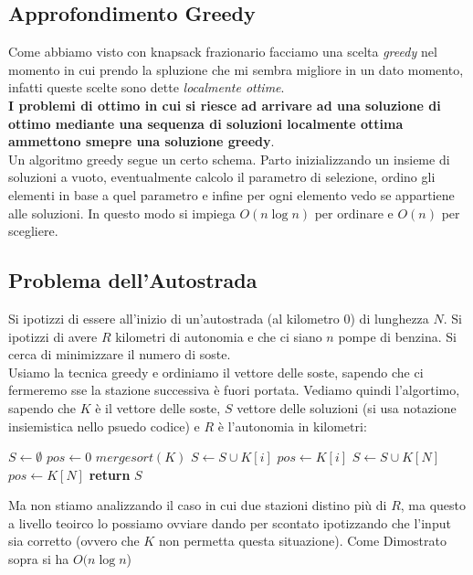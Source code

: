 \documentclass[a4paper,12pt, oneside]{book}
\begin{document}
\subsection{Approfondimento Greedy}
Come abbiamo visto con knapsack frazionario facciamo una scelta
\textit{greedy} nel momento in cui prendo la spluzione che mi sembra
migliore in un dato momento, infatti queste scelte sono dette
\textit{localmente ottime}.\\
\textbf{I problemi di ottimo in cui si riesce ad arrivare ad una soluzione di
  ottimo mediante una sequenza di soluzioni localmente ottima
  ammettono smepre una soluzione greedy}.\\
Un algoritmo greedy segue un certo schema. Parto inizializzando un insieme
di soluzioni a vuoto, eventualmente calcolo il parametro di selezione,
ordino gli elementi in base a quel parametro e infine per ogni
elemento vedo se appartiene alle soluzioni. In questo modo si impiega
$O(n\log n)$ per ordinare e $O(n)$ per scegliere.\\
\subsection{Problema dell'Autostrada}
Si ipotizzi di essere all'inizio di un'autostrada (al kilometro 0) di
lunghezza $N$. Si ipotizzi di avere $R$ kilometri di autonomia e che
ci siano $n$ pompe di benzina. Si cerca di minimizzare il numero di
soste.\\
Usiamo la tecnica greedy e ordiniamo il vettore delle soste, sapendo
che ci fermeremo sse la stazione successiva è fuori portata. Vediamo
quindi l'algortimo, sapendo che $K$ è il vettore delle soste, $S$
vettore delle soluzioni (si usa notazione insiemistica nello psuedo
codice) e $R$ è l'autonomia in kilometri:
\begin{shaded}
  \begin{algorithmic}
    \State $S\gets \emptyset$
    \State $pos\gets 0$
    \State $mergesort(K)$
    \State $S\gets S\cup K[i]$
    \State $pos \gets K[i]$
    \EndIf
    \EndFor
    \State $S\gets S\cup K[N]$
    \State $pos \gets K[N]$
    \EndIf
    \State \textbf{return }$S$
    \EndFunction
  \end{algorithmic}
\end{shaded}
Ma non stiamo analizzando il caso in cui due stazioni distino più di
$R$, ma questo a livello teoirco lo possiamo ovviare dando per
scontato ipotizzando che l'input sia corretto (ovvero che $K$ non
permetta questa situazione). Come Dimostrato sopra si ha $O(n\log n$)
\end{document}
